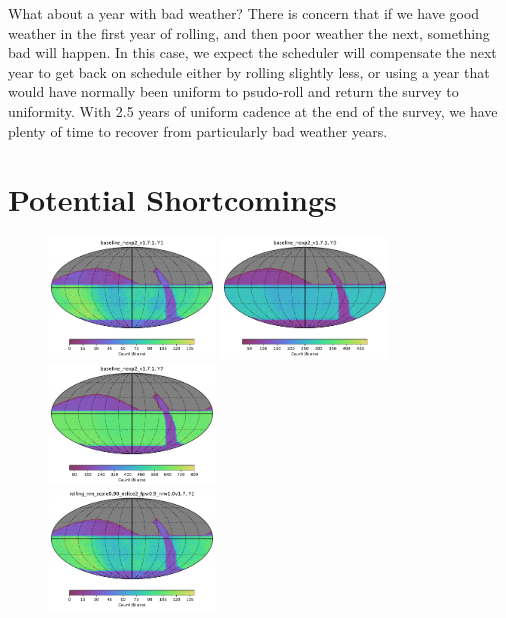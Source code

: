 \documentclass[modern]{aastex62}
\begin{document}
What about a year with bad weather? There is concern that if we have good weather in the first year of rolling, and then poor weather the next, something bad will happen. In this case, we expect the scheduler will compensate the next year to get back on schedule either by rolling slightly less, or using a year that would have normally been uniform to psudo-roll and return the survey to uniformity. With 2.5 years of uniform cadence at the end of the survey, we have plenty of time to recover from particularly bad weather years.



\section{Potential Shortcomings}

\begin{figure}
\includegraphics[width=1.75in]{plots/yearly_release/baseline_nexp2_v1_7_1_Count_night_lt_365_and_note_not_like_DD_HEAL_SkyMap.pdf}
\includegraphics[width=1.75in]{plots/yearly_release/baseline_nexp2_v1_7_1_Count_nightlt1095_and_note_not_like_DD_HEAL_SkyMap.pdf}
\includegraphics[width=1.75in]{plots/yearly_release/baseline_nexp2_v1_7_1_Count_night_lt_2556_and_note_not_like_DD_HEAL_SkyMap.pdf}\\
\includegraphics[width=1.75in]{plots/yearly_release/rolling_nm_scale0_90_nslice2_fpw0_9_nrw1_0v1_7_Count_night_lt_365_and_note_not_like_DD_HEAL_SkyMap.pdf}

\end{figure}
\end{document}
